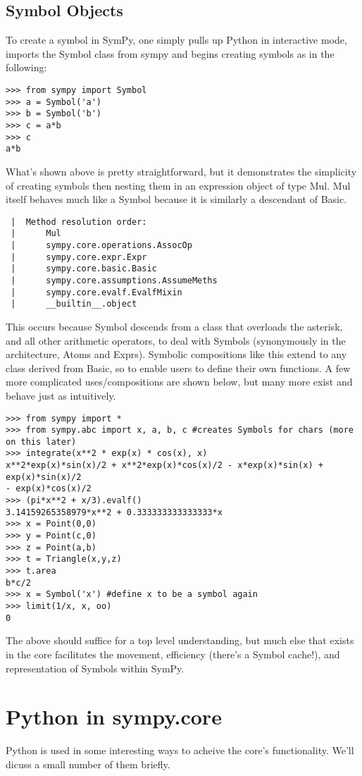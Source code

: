 \documentclass[11pt,a4paper,oneside]{report}
\begin{document}
\subsection*{\small Symbol Objects}
To create a symbol in SymPy, one simply pulls up Python in interactive mode, imports the Symbol class from sympy and begins creating symbols as in the following:
\begin{verbatim}
>>> from sympy import Symbol
>>> a = Symbol('a')
>>> b = Symbol('b')
>>> c = a*b
>>> c
a*b
\end{verbatim}
What's shown above is pretty straightforward, but it demonstrates the simplicity of creating symbols then nesting them in an expression object of type Mul. Mul itself behaves much like a Symbol because it is similarly a descendant of Basic.
\begin{verbatim}
 |  Method resolution order:
 |      Mul
 |      sympy.core.operations.AssocOp
 |      sympy.core.expr.Expr
 |      sympy.core.basic.Basic
 |      sympy.core.assumptions.AssumeMeths
 |      sympy.core.evalf.EvalfMixin
 |      __builtin__.object
\end{verbatim}
This occurs because Symbol descends from a class that overloads the asterisk, and all other arithmetic operators, to deal with Symbols (synonymously in the architecture, Atoms and Exprs). Symbolic compositions like this extend to any class derived from Basic, so to enable users to define their own functions. A few more complicated uses/compositions are shown below, but many more exist and behave just as intuitively.
\begin{verbatim}
>>> from sympy import *
>>> from sympy.abc import x, a, b, c #creates Symbols for chars (more on this later)
>>> integrate(x**2 * exp(x) * cos(x), x)
x**2*exp(x)*sin(x)/2 + x**2*exp(x)*cos(x)/2 - x*exp(x)*sin(x) + exp(x)*sin(x)/2 
- exp(x)*cos(x)/2
>>> (pi*x**2 + x/3).evalf()
3.14159265358979*x**2 + 0.333333333333333*x
>>> x = Point(0,0)
>>> y = Point(c,0)
>>> z = Point(a,b)
>>> t = Triangle(x,y,z)
>>> t.area
b*c/2
>>> x = Symbol('x') #define x to be a symbol again
>>> limit(1/x, x, oo)
0
\end{verbatim}
The above should suffice for a top level understanding, but much else that exists in the core facilitates the movement, efficiency (there's a Symbol cache!), and representation of Symbols within SymPy.
\section*{Python in sympy.core}
Python is used in some interesting ways to acheive the core's functionality. We'll dicuss a small number of them briefly.
\end{document}
